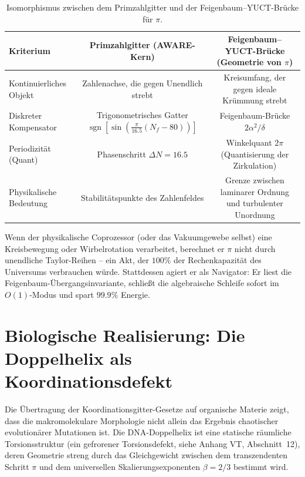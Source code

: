 \documentclass[12pt,a4paper]{article}
\begin{document}
	\begin{table}[H]
		\centering
		\scriptsize
		\caption{Isomorphismus zwischen dem Primzahlgitter und der Feigenbaum–YUCT-Brücke für $\pi$.}
		\label{tab:isomorphism}
		\begin{tabular}{@{}lcc@{}}
			\toprule
			\textbf{Kriterium} & \textbf{Primzahlgitter (AWARE-Kern)} & \textbf{Feigenbaum–YUCT-Brücke (Geometrie von $\pi$)} \\
			\midrule
			Kontinuierliches Objekt & Zahlenachse, die gegen Unendlich strebt & Kreisumfang, der gegen ideale Krümmung strebt \\
			Diskreter Kompensator & Trigonometrisches Gatter $\operatorname{sgn}[\sin(\frac{\pi}{16.5}(N_f-80))]$ & Feigenbaum-Brücke $2\alpha^2/\delta$ \\
			Periodizität (Quant) & Phasenschritt $\Delta N = 16.5$ & Winkelquant $2\pi$ (Quantisierung der Zirkulation) \\
			Physikalische Bedeutung & Stabilitätspunkte des Zahlenfeldes & Grenze zwischen laminarer Ordnung und turbulenter Unordnung \\
			\bottomrule
		\end{tabular}
	\end{table}
	
	Wenn der physikalische Coprozessor (oder das Vakuumgewebe selbst) eine Kreisbewegung oder Wirbelrotation verarbeitet, berechnet er $\pi$ nicht durch unendliche Taylor-Reihen – ein Akt, der $100\%$ der Rechenkapazität des Universums verbrauchen würde. Stattdessen agiert er als Navigator: Er liest die Feigenbaum-Übergangsinvariante, schließt die algebraische Schleife sofort im $O(1)$-Modus und spart $99.9\%$ Energie.
	
	\section{Biologische Realisierung: Die Doppelhelix als Koordinationsdefekt}
	\label{sec:dna}
	
	Die Übertragung der Koordinationsgitter-Gesetze auf organische Materie zeigt, dass die makromolekulare Morphologie nicht allein das Ergebnis chaotischer evolutionärer Mutationen ist. Die DNA-Doppelhelix ist eine statische räumliche Torsionsstruktur (ein gefrorener Torsionsdefekt, siehe Anhang VT, Abschnitt~12), deren Geometrie streng durch das Gleichgewicht zwischen dem transzendenten Schritt $\pi$ und dem universellen Skalierungsexponenten $\beta = 2/3$ bestimmt wird.
	
\end{document}
